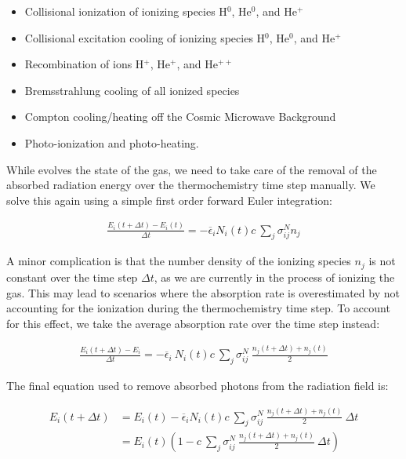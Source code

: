 \begin{itemize}
 \item Collisional ionization of ionizing species H$^0$, He$^0$, and He$^+$
 \item Collisional excitation cooling of ionizing species H$^0$, He$^0$, and He$^+$
 \item Recombination of ions H$^+$, He$^+$, and He$^{++}$
 \item Bremsstrahlung cooling of all ionized species
 \item Compton cooling/heating off the Cosmic Microwave Background
 \item Photo-ionization and photo-heating.
\end{itemize}

While \grackle evolves the state of the gas, we need to take care of the removal of the absorbed
radiation energy over the thermochemistry time step manually.
We solve this again using a simple first order forward Euler integration:

\begin{align}
\frac{E_i (t + \Delta t) - E_i(t)}{\Delta t} =
    -\overline{\epsilon}_i N_i(t) c \ \sum_j \sigma_{i j} ^ N n_j
\end{align}

A minor complication is that the number density of the ionizing species $n_j$ is not constant over
the time step $\Delta t$, as we are currently in the process of ionizing the gas. This may lead to
scenarios where the absorption rate is overestimated by not accounting for the ionization during
the thermochemistry time step. To account for this effect, we take the average absorption rate over
the time step instead:


\begin{align}
    \frac{E_i (t + \Delta t) - E_i}{\Delta t}
        = -\overline{\epsilon}_i \ N_i(t) c \ \sum_j \sigma_{i j} ^ N  \
    \frac{n_j(t + \Delta t) + n_j(t)}{2}
\end{align}

The final equation used to remove absorbed photons from the radiation field is:

\begin{align}
E_i (t + \Delta t)
    &= E_i(t) - \overline{\epsilon}_i N_i(t) c \ \sum_j \sigma_{i j} ^ N  \
    \frac{n_j(t + \Delta t) + n_j(t)}{2} \ \Delta t \\
    &= E_i(t) \left(1 - c \ \sum_j \sigma_{i j} ^ N  \
    \frac{n_j(t + \Delta t) + n_j(t)}{2} \ \Delta t \right)
\end{align}

